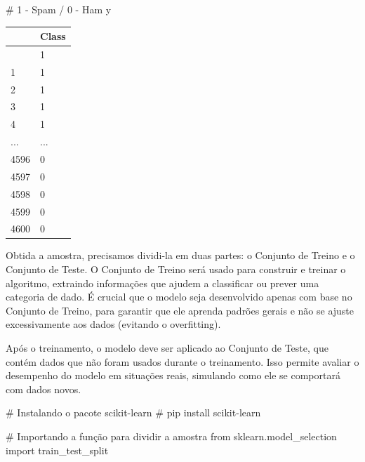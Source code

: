 \documentclass[
  letterpaper,
  DIV=11,
  numbers=noendperiod]{scrreprt}
\newenvironment{Shaded}{\begin{snugshade}}{\end{snugshade}}
\newcommand{\CommentTok}[1]{\textcolor[rgb]{0.37,0.37,0.37}{#1}}
\newcommand{\ImportTok}[1]{\textcolor[rgb]{0.00,0.46,0.62}{#1}}
\newcommand{\NormalTok}[1]{\textcolor[rgb]{0.00,0.23,0.31}{#1}}
\begin{document}
\begin{Shaded}
\begin{Highlighting}[]
\CommentTok{\# 1 {-} Spam / 0 {-} Ham}
\NormalTok{y}
\end{Highlighting}
\end{Shaded}

\begin{longtable}[]{@{}ll@{}}
\toprule\noalign{}
& Class \\
\midrule\noalign{}
\endhead
\bottomrule\noalign{}
\endlastfoot
0 & 1 \\
1 & 1 \\
2 & 1 \\
3 & 1 \\
4 & 1 \\
... & ... \\
4596 & 0 \\
4597 & 0 \\
4598 & 0 \\
4599 & 0 \\
4600 & 0 \\
\end{longtable}

Obtida a amostra, precisamos dividi-la em duas partes: o Conjunto de
Treino e o Conjunto de Teste. O Conjunto de Treino será usado para
construir e treinar o algoritmo, extraindo informações que ajudem a
classificar ou prever uma categoria de dado. É crucial que o modelo seja
desenvolvido apenas com base no Conjunto de Treino, para garantir que
ele aprenda padrões gerais e não se ajuste excessivamente aos dados
(evitando o overfitting).

Após o treinamento, o modelo deve ser aplicado ao Conjunto de Teste, que
contém dados que não foram usados durante o treinamento. Isso permite
avaliar o desempenho do modelo em situações reais, simulando como ele se
comportará com dados novos.

\begin{Shaded}
\begin{Highlighting}[]
\CommentTok{\# Instalando o pacote scikit{-}learn}
\CommentTok{\# pip install scikit{-}learn}
\end{Highlighting}
\end{Shaded}

\begin{Shaded}
\begin{Highlighting}[]
\CommentTok{\# Importando a função para dividir a amostra}
\ImportTok{from}\NormalTok{ sklearn.model\_selection }\ImportTok{import}\NormalTok{ train\_test\_split}
\end{Highlighting}
\end{Shaded}
\end{document}

